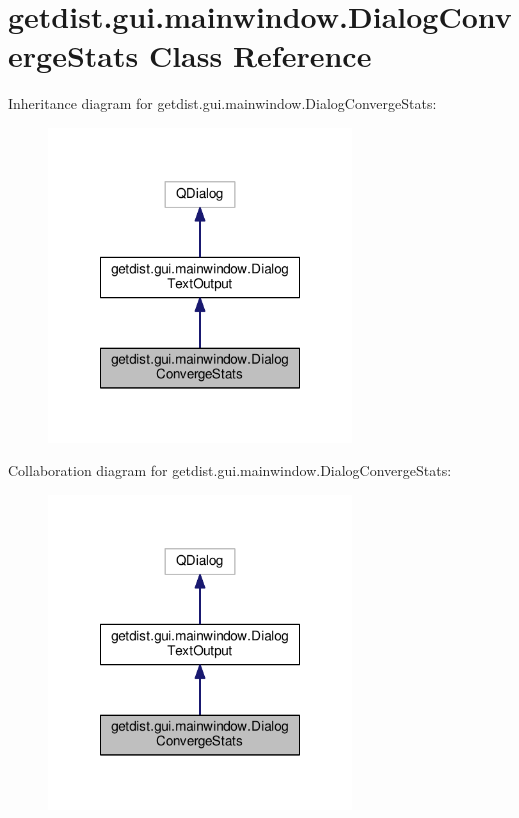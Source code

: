 \hypertarget{classgetdist_1_1gui_1_1mainwindow_1_1DialogConvergeStats}{}\section{getdist.\+gui.\+mainwindow.\+Dialog\+Converge\+Stats Class Reference}
\label{classgetdist_1_1gui_1_1mainwindow_1_1DialogConvergeStats}


Inheritance diagram for getdist.\+gui.\+mainwindow.\+Dialog\+Converge\+Stats\+:
\nopagebreak
\begin{figure}[H]
\begin{center}
\leavevmode
\includegraphics[width=228pt]{classgetdist_1_1gui_1_1mainwindow_1_1DialogConvergeStats__inherit__graph}
\end{center}
\end{figure}


Collaboration diagram for getdist.\+gui.\+mainwindow.\+Dialog\+Converge\+Stats\+:
\nopagebreak
\begin{figure}[H]
\begin{center}
\leavevmode
\includegraphics[width=228pt]{classgetdist_1_1gui_1_1mainwindow_1_1DialogConvergeStats__coll__graph}
\end{center}
\end{figure}
